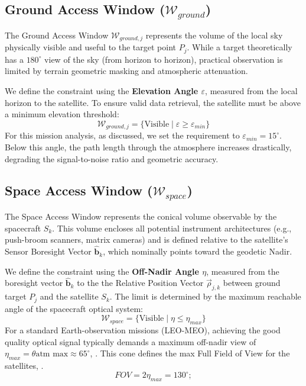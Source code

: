 \subsection{Ground Access Window ($\mathcal{W}_{ground}$)}
The Ground Access Window $\mathcal{W}_{ground,j}$ represents the volume of the local sky physically visible and useful to the target point $P_j$. While a target theoretically has a $180^{\circ}$ view of the sky (from horizon to horizon), practical observation is limited by terrain geometric masking and atmospheric attenuation.

We define the constraint using the \textbf{Elevation Angle $\varepsilon$}, measured from the local horizon to the satellite. To ensure valid data retrieval, the satellite must be above a minimum elevation threshold:
\begin{equation}
    \mathcal{W}_{ground,j} = \{ \text{Visible} \mid \varepsilon \geq \varepsilon_{min} \}
\end{equation}
For this mission analysis, as discussed, we set the requirement to $\varepsilon_{min} = 15^{\circ}$. Below this angle, the path length through the atmosphere increases drastically, degrading the signal-to-noise ratio and geometric accuracy.

\subsection{Space Access Window ($\mathcal{W}_{space}$)}
The Space Access Window represents the conical volume observable by the spacecraft $S_k$. This volume encloses all potential instrument architectures (e.g., push-broom scanners, matrix cameras) and is defined relative to the satellite's Sensor Boresight Vector $\hat{\mathbf{b}}_k$, which nominally points toward the geodetic Nadir.

We define the constraint using the \textbf{Off-Nadir Angle $\eta$}, measured from the boresight vector $\hat{\mathbf{b}}_k$ to the the Relative Position Vector $\vec{\rho}_{j,k}$ between ground target $P_j$ and the satellite $S_k$. The limit is determined by the maximum reachable angle of the spacecraft optical system:
\begin{equation}
    \mathcal{W}_{space} = \{ \text{Visible} \mid \eta \leq \eta_{max} \}
\end{equation}
For a standard Earth-observation missions (LEO-MEO), achieving the good quality optical signal typically demands a maximum off-nadir view of $\eta_{max} = \theta{\text{atm max}} \approx 65^{\circ}$, . This cone defines the max Full Field of View for the satellites, .
\begin{equation}
    FOV = 2  \eta_{max} = 130^\circ; 
\end{equation}
